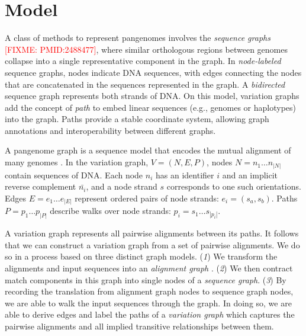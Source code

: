 \documentclass{bioinfo}
\newcommand{\red}[1]{{\textcolor{Red}{#1}}}
\newcommand{\FIXME}[1]{\red{[FIXME: #1]}}
\begin{document}

\section{Model}
\label{sec:model}

A class of methods to represent pangenomes involves the \textit{sequence graphs} \FIXME{PMID:2488477}, where similar orthologous regions between genomes collapse into a single representative component in the graph.
In \textit{node-labeled} sequence graphs, nodes indicate DNA sequences, with edges connecting the nodes that are concatenated in the sequences represented in the graph.
A \textit{bidirected} sequence graph represents both strands of DNA.
On this model, variation graphs add the concept of \textit{path} to embed linear sequences (e.g., genomes or haplotypes) into the graph\citep{Garrison:2018}.
Paths provide a stable coordinate system, allowing graph annotations and interoperability between different graphs.

A pangenome graph is a sequence model that encodes the mutual alignment of many genomes \citep{Garrison_2019_thesis,Eizenga_2020}.
In the variation graph, $V = (N, E, P)$, nodes $N = n_1\ldots n_{|N|}$ contain sequences of DNA.
Each node $n_i$ has an identifier $i$ and an implicit reverse complement $\bar{n_i}$, and a node strand $s$ corresponds to one such orientations.
Edges $E = e_1\ldots e_{|E|}$ represent ordered pairs of node strands: $e_i = ( s_a, s_b )$.
Paths $P = p_1\ldots p_{|P|}$ describe walks over node strands: $p_i = s_1 \ldots s_{|p_i|}$.

A variation graph represents all pairwise alignments between its paths.
It follows that we can construct a variation graph from a set of pairwise alignments.
We do so in a process based on three distinct graph models.
(\textit{1}) We transform the alignments and input sequences into an \textit{alignment graph} \cite{Kehr_2014}.
(\textit{2}) We then contract match components in this graph into single nodes of a \textit{sequence graph}.
(\textit{3}) By recording the translation from alignment graph nodes to sequence graph nodes, we are able to walk the input sequences through the graph.
In doing so, we are able to derive edges and label the paths of a \textit{variation graph} which captures the pairwise alignments and all implied transitive relationships between them.
\end{document}
